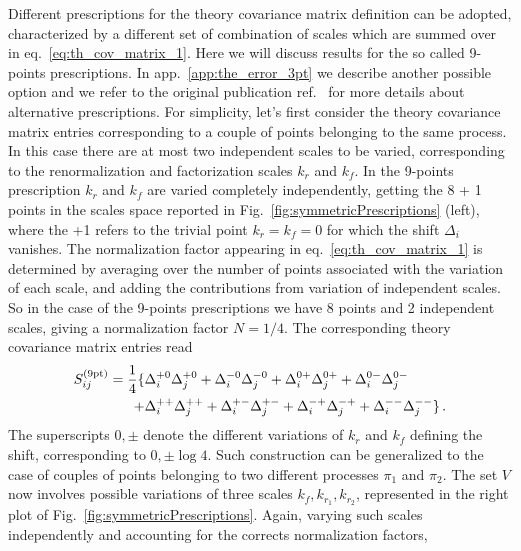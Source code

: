 %
Different prescriptions for the theory covariance matrix definition can be adopted, characterized by a different
set of combination of scales which are summed over in eq.~\eqref{eq:th_cov_matrix_1}.
Here we will discuss results for the so called 9-points prescriptions. In app.~\ref{app:the_error_3pt}
we describe another possible option and we refer to the original publication 
ref.~\cite{AbdulKhalek:2020jut} for more details about alternative prescriptions.
For simplicity, let's first consider the theory covariance matrix entries corresponding to 
a couple of points belonging to the same process. In this case there are at most two independent scales to be varied,
corresponding to the renormalization and factorization scales $k_r$ and $k_f$.
In the 9-points prescription $k_r$ and $k_f$ are varied completely independently, getting the 8 + 1 points in the 
scales space reported in Fig.~\ref{fig:symmetricPrescriptions} (left), where the +1 refers to the trivial 
point $k_r=k_f=0$ for which the shift $\Delta_i$ vanishes.
The normalization factor appearing in eq.~\eqref{eq:th_cov_matrix_1}
is determined by averaging over the number of points associated with the variation of each scale,
and adding the contributions from variation of independent scales.
So in the case of the 9-points prescriptions we have 8 points and 2 independent scales, 
giving a normalization factor $N=1/4$. The corresponding theory covariance matrix entries read
\begin{equation}
    \label{9S}
    \begin{split}
        S^{(\rm 9pt)}_{ij} = \frac{1}{4}\{ &\Delta_i^{+0} \Delta_j^{+0} + \Delta_i^{-0}\Delta_j^{-0}
                                + \Delta_i^{0+} \Delta_j^{0+} + \Delta_i^{0-}\Delta_j^{0-} \\
                                + &\Delta_i^{++}\Delta_j^{++} + \Delta_i^{+-} \Delta_j^{+-}
                                + \Delta_i^{-+}\Delta_j^{-+} + \Delta_i^{--} \Delta_j^{--} \} \,.
    \end{split}                            
\end{equation}
The superscripts $0,\pm$ denote the different variations of $k_r$ and $k_f$ defining the shift,
corresponding to $ 0,\pm \log4$. 
Such construction can be generalized to the case of couples of
points belonging to two different processes $\pi_1$ and $\pi_2$. The set $V$ now involves 
possible variations of three scales $k_f,k_{r_1}, k_{r_2}$, represented in the right plot 
of Fig.~\ref{fig:symmetricPrescriptions}.
Again, varying such scales independently and accounting for the corrects normalization factors,
